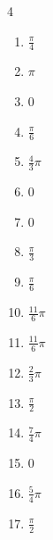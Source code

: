 \begin{multicols}{4}
\begin{enumerate}
  \item $\displaystyle \frac{\pi}{4}$

  \item $\displaystyle \pi$

  \item $\displaystyle 0$

  \item $\displaystyle \frac{\pi}{6}$

  \item $\displaystyle \frac{4}{3}\pi$

  \item $\displaystyle 0$

  \item $\displaystyle 0$

  \item $\displaystyle \frac{\pi}{3}$

  \item $\displaystyle \frac{\pi}{6}$

  \item $\displaystyle \frac{11}{6}\pi$

  \item $\displaystyle \frac{11}{6}\pi$

  \item $\displaystyle \frac{2}{3}\pi$

  \item $\displaystyle \frac{\pi}{2}$

  \item $\displaystyle \frac{7}{4}\pi$

  \item $\displaystyle 0$

  \item $\displaystyle \frac{5}{4}\pi$

  \item $\displaystyle \frac{\pi}{2}$


\end{enumerate}
\end{multicols}
